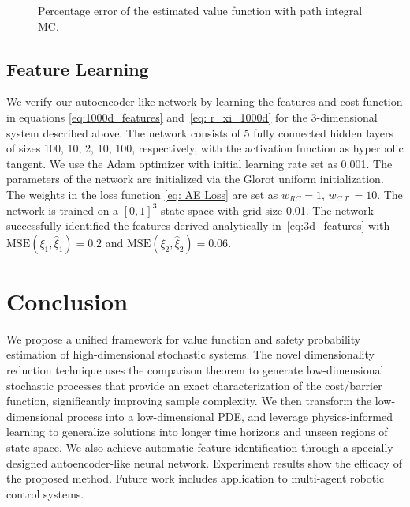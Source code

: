 \documentclass[letterpaper]{article} %
\newcommand{\todo}[1]{\textcolor{blue}{[TODO: #1]}}
\newcommand{\resolved}[1]{}
\begin{document}
\begin{figure}
    \centering
    
    \vspace{-0.5em}
    \caption{Percentage error of the estimated value function with path integral MC.}
    \vspace{-0.5em}
    \resolved{refine the plot, use pdf format}
    \label{fig:sample_complexity}
\end{figure}

\vspace{-0.3em}

\subsection{Feature Learning}
We verify our autoencoder-like network by learning the features and cost function in equations \eqref{eq:1000d_features} and~\eqref{eq: r_xi_1000d} for the 3-dimensional system described above. The network consists of 5 fully connected hidden layers of sizes 100, 10, 2, 10, 100, respectively, with the activation function as hyperbolic tangent. We use the Adam optimizer with initial learning rate set as 0.001. The parameters of the network are initialized via the Glorot uniform initialization. The weights in the loss function \eqref{eq: AE Loss} are set as $w_{RC}=1, \,w_{C.T.}=10$. The network is trained on a $[0, 1]^3$ state-space with grid size 0.01. The network successfully identified the features derived analytically in~\eqref{eq:3d_features} with $\mathrm{MSE}(\xi_1, \hat{\xi}_1)=0.2$ and $\mathrm{MSE}(\xi_2, \hat{\xi}_2)=0.06$. 


\vspace{-0.3em}

\section{Conclusion}
\label{sec:conclusion}

We propose a unified framework for value function and safety probability estimation of high-dimensional stochastic systems. The novel dimensionality reduction technique uses the comparison theorem to generate low-dimensional stochastic processes that provide an exact characterization of the cost/barrier function, significantly improving sample complexity. We then transform the low-dimensional process into a low-dimensional PDE, and leverage physics-informed learning to generalize solutions into longer time horizons and unseen regions of state-space. We also achieve automatic feature identification through a specially designed autoencoder-like neural network. Experiment results show the efficacy of the proposed method. Future work includes application to multi-agent robotic control systems.
\end{document}

